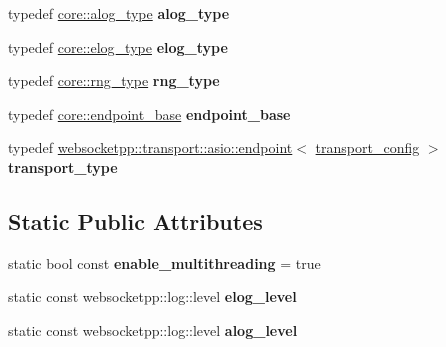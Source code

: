 \begin{DoxyCompactItemize}
\item 
typedef \hyperlink{classwebsocketpp_1_1log_1_1basic}{core\+::alog\+\_\+type} {\bfseries alog\+\_\+type}\hypertarget{structtestee__config_a6389e76c8f9e52c854b9e90501ae1ab1}{}\label{structtestee__config_a6389e76c8f9e52c854b9e90501ae1ab1}

\item 
typedef \hyperlink{classwebsocketpp_1_1log_1_1basic}{core\+::elog\+\_\+type} {\bfseries elog\+\_\+type}\hypertarget{structtestee__config_a6cc4f2421eef3cd185e49a99294955bf}{}\label{structtestee__config_a6cc4f2421eef3cd185e49a99294955bf}

\item 
typedef \hyperlink{classwebsocketpp_1_1random_1_1none_1_1int__generator}{core\+::rng\+\_\+type} {\bfseries rng\+\_\+type}\hypertarget{structtestee__config_ae66fe318a122e964d795d81ce77b1230}{}\label{structtestee__config_ae66fe318a122e964d795d81ce77b1230}

\item 
typedef \hyperlink{structwebsocketpp_1_1config_1_1core_a5389422816ef3115fb8b7f4cd92d5ca3}{core\+::endpoint\+\_\+base} {\bfseries endpoint\+\_\+base}\hypertarget{structtestee__config_ad51c0a31f1f65737c2dede017e2d6912}{}\label{structtestee__config_ad51c0a31f1f65737c2dede017e2d6912}

\item 
typedef \hyperlink{classwebsocketpp_1_1transport_1_1asio_1_1endpoint}{websocketpp\+::transport\+::asio\+::endpoint}$<$ \hyperlink{structtestee__config_1_1transport__config}{transport\+\_\+config} $>$ {\bfseries transport\+\_\+type}\hypertarget{structtestee__config_a431277022fbca101284ed18d4cb96468}{}\label{structtestee__config_a431277022fbca101284ed18d4cb96468}

\end{DoxyCompactItemize}
\subsection*{Static Public Attributes}
\begin{DoxyCompactItemize}
\item 
static bool const {\bfseries enable\+\_\+multithreading} = true\hypertarget{structtestee__config_a4c4e9e0617fa369fbed87b5eb0325a1f}{}\label{structtestee__config_a4c4e9e0617fa369fbed87b5eb0325a1f}

\item 
static const websocketpp\+::log\+::level {\bfseries elog\+\_\+level}
\item 
static const websocketpp\+::log\+::level {\bfseries alog\+\_\+level}
\end{DoxyCompactItemize}


